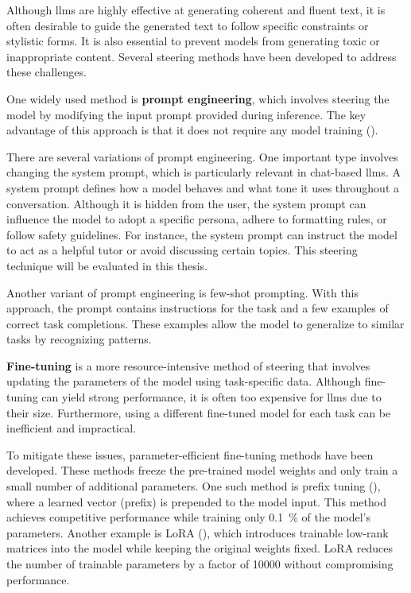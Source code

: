 Although \acp{llm} are highly effective at generating coherent and fluent text, it is often desirable to guide the generated text to follow specific constraints or stylistic forms. It is also essential to prevent models from generating toxic or inappropriate content. Several steering methods have been developed to address these challenges.

One widely used method is \textbf{prompt engineering}, which involves steering the model by modifying the input prompt provided during inference. The key advantage of this approach is that it does not require any model training (\cite{schulhoffPromptReportSystematic2024}).

There are several variations of prompt engineering. One important type involves changing the system prompt, which is particularly relevant in chat-based \acp{llm}. A system prompt defines how a model behaves and what tone it uses throughout a conversation. Although it is hidden from the user, the system prompt can influence the model to adopt a specific persona, adhere to formatting rules, or follow safety guidelines. For instance, the system prompt can instruct the model to act as a helpful tutor or avoid discussing certain topics. This steering technique will be evaluated in this thesis.

Another variant of prompt engineering is few-shot prompting. With this approach, the prompt contains instructions for the task and a few examples of correct task completions. These examples allow the model to generalize to similar tasks by recognizing patterns.

\textbf{Fine-tuning} is a more resource-intensive method of steering that involves updating the parameters of the model using task-specific data. Although fine-tuning can yield strong performance, it is often too expensive for \acp{llm} due to their size. Furthermore, using a different fine-tuned model for each task can be inefficient and impractical.

To mitigate these issues, parameter-efficient fine-tuning methods have been developed. These methods freeze the pre-trained model weights and only train a small number of additional parameters. One such method is prefix tuning (\cite{liPrefixtuningOptimizingContinuous2021}), where a learned vector (prefix) is prepended to the model input. This method achieves competitive performance while training only \SI{0.1}{\percent} of the model's parameters. Another example is LoRA (\cite{huLoRALowrankAdaptation2021}), which introduces trainable low-rank matrices into the model while keeping the original weights fixed. LoRA reduces the number of trainable parameters by a factor of \num{10000} without compromising performance.

